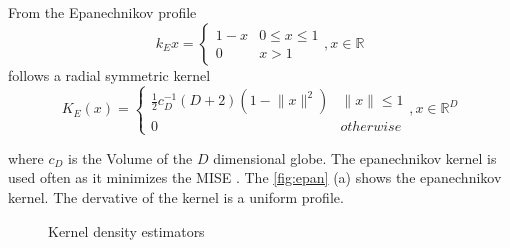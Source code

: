 From the Epanechnikov profile
\begin{equation}\label{eq:epa}
	k_E{x} = \begin{cases}
				1 - x &  0 \leq x \leq 1\\
				0 & x > 1
		\end{cases}, x \in \mathbb{R}
\end{equation}
follows a radial symmetric kernel
\begin{equation}\label{eq:epak}
	K_E(x) = \begin{cases}
				\frac{1}{2}c_D^{-1}(D+2)(1-\lVert x \rVert^2) &  \lVert x \rVert \leq 1 \\
				0 & \mathit{otherwise}
		\end{cases}, x \in \mathbb{R}^D
\end{equation}
 
where $c_D$ is the Volume of the $D$ dimensional globe. The epanechnikov kernel
is used often as it minimizes the \gls{MISE} \citep{citeulike:5813637}. The
\autoref{fig:epan} (a) shows the epanechnikov kernel. The dervative of the 
kernel is a uniform profile.



\begin{figure}[ht]
\centering
{}%
%
%
\caption{Kernel density estimators}
\label{fig:kernels}
\end{figure}

